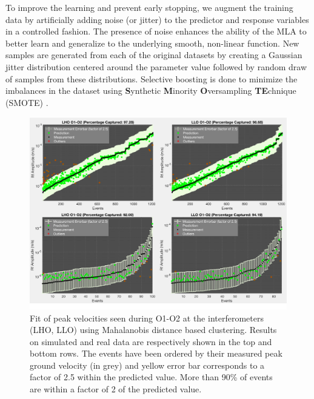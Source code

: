 \documentclass[preprint, aps, showpacs]{revtex4-1}
\begin{document}
To improve the learning and prevent early stopping, we augment the training data by artificially adding noise (or jitter) to the predictor and response variables in a controlled fashion. The presence of noise enhances the ability of the MLA to better learn and generalize to the underlying smooth, non-linear function. New samples are generated from each of the original datasets by creating a Gaussian jitter distribution centered around the parameter value followed by random draw of samples from these distributions. Selective boosting is done to minimize the imbalances in the dataset using \textbf{S}ynthetic \textbf{M}inority \textbf{O}versampling \textbf{TE}chnique (SMOTE) \cite{ChBo2011}. 

\begin{figure}[!htb]
\hspace*{-0.5cm}
 \includegraphics[width=\textwidth]{./plots/ClusteringPrediction.pdf}
 \caption{Fit of peak velocities seen during O1-O2 at the interferometers (LHO, LLO) using Mahalanobis distance based clustering. Results on simulated and real data are respectively shown in the top and bottom rows. The events have been ordered by their measured peak ground velocity (in grey) and yellow error bar corresponds to a factor of 2.5 within the predicted value. More than 90\% of events are within a factor of 2 of the predicted value.}
 \label{fig:regression}
\end{figure}
\end{document}
